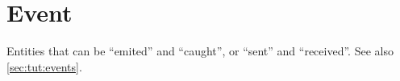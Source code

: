 \section{Event}
Entities that can be ``emited'' and ``caught'', or ``sent'' and
``received''.  See also \autoref{sec:tut:events}.

